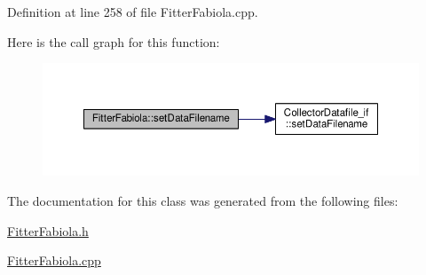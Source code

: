 Definition at line 258 of file Fitter\-Fabiola.\-cpp.



Here is the call graph for this function\-:
\nopagebreak
\begin{figure}[H]
\begin{center}
\leavevmode
\includegraphics[width=350pt]{class_fitter_fabiola_a3edd954df450b042f1989705c5e288ab_cgraph}
\end{center}
\end{figure}




The documentation for this class was generated from the following files\-:\begin{DoxyCompactItemize}
\item 
\hyperlink{_fitter_fabiola_8h}{Fitter\-Fabiola.\-h}\item 
\hyperlink{_fitter_fabiola_8cpp}{Fitter\-Fabiola.\-cpp}\end{DoxyCompactItemize}
